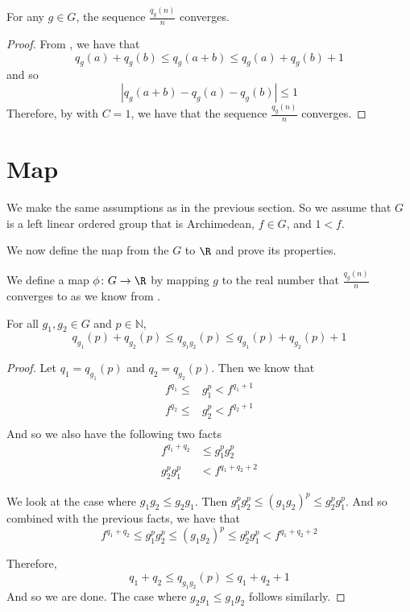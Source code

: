 \begin{theorem}\label{q_convergence}
    \leanok{}
    For any $g \in G$, the sequence $\frac{q_g(n)}{n}$ converges.
\end{theorem}
\begin{proof}\leanok
From , we have that
\[
q_g(a) + q_g(b) \le q_g(a+b) \le q_g(a)+q_g(b) + 1
\]
and so
\[
|q_g(a+b) - q_g(a) - q_g(b)| \le 1
\]
Therefore, by  with $C = 1$, we have that
the sequence $\frac{q_g(n)}{n}$ converges.
\end{proof}

\section{Map}
We make the same assumptions as in the previous section.
So we assume that $G$ is a left linear ordered group
that is Archimedean, $f\in G$, and $1 < f$.

We now define the map from the $G$ to $\R$ and prove its properties.

\begin{definition}\label{def:phi}
    \leanok{}
    We define a map $\phi\colon G \to \R$ by mapping $g$
    to the real number that $\frac{q_g(n)}{n}$ converges to
    as we know from .
\end{definition}

\begin{theorem}\label{phi_hom_case}
    \leanok{}
    For all $g_1,g_2 \in G$ and $p\in \mathbb{N}$,
    \[
    q_{g_1}(p) + q_{g_2}(p) \le q_{g_1g_2}(p) \le q_{g_1}(p) + q_{g_2}(p) + 1
    \]
\end{theorem}
\begin{proof}\leanok
Let $q_1 = q_{g_1}(p)$ and $q_2 = q_{g_2}(p)$. Then we know that
\begin{align*}
f^{q_1} \le &g_1^p < f^{q_1+1}\\
f^{q_2} \le &g_2^p < f^{q_2+1}\\
\end{align*}
And so we also have the following two facts
\begin{align*}
f^{q_1+q_2}&\le g_1^p g_2^p\\
g_2^p g_1^p& < f^{q_1 + q_2 + 2}
\end{align*}

We look at the case where $g_1g_2 \le g_2g_1$.
Then $g_1^p g_2^p \le (g_1g_2)^p \le g_2^p g_1^p$.
And so combined with the previous facts, we have that
\[
f^{q_1+q_2}\le g_1^p g_2^p \le (g_1g_2)^p \le g_2^p g_1^p < f^{q_1+q_2+2}
\]

Therefore,
\[
q_1+q_2 \le q_{g_1g_2}(p) \le q_1+q_2+1
\]
And so we are done.
The case where $g_2g_1 \le g_1g_2$ follows similarly.
\end{proof}

